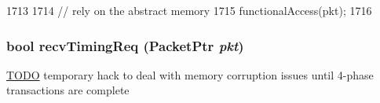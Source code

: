 \begin{DoxyCode}
1713 {
1714     // rely on the abstract memory
1715     functionalAccess(pkt);
1716 }
\end{DoxyCode}
\hypertarget{classDRAMCtrl_a3344d9dd0f83257feab5424e761f31c6}{
\subsubsection[{recvTimingReq}]{\setlength{\rightskip}{0pt plus 5cm}bool recvTimingReq ({\bf PacketPtr} {\em pkt})}}
\label{classDRAMCtrl_a3344d9dd0f83257feab5424e761f31c6}


\begin{Desc}
\item[\hyperlink{todo__todo000082}{TODO}]temporary hack to deal with memory corruption issues until 4-\/phase transactions are complete \end{Desc}



